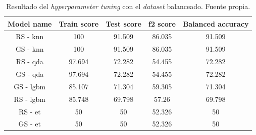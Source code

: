 \begin{table}[!ht]
    \centering
    \begin{tabular}{|c|cccc|} \hline
        Model name & Train score & Test score & f2 score & Balanced accuracy \\ \hline
        RS - knn & 100 & 91.509 & 86.035 & 91.509 \\
        GS - knn & 100 & 91.509 & 86.035 & 91.509 \\
        RS - qda & 97.694 & 72.282 & 54.455 & 72.282 \\
        GS - qda & 97.694 & 72.282 & 54.455 & 72.282 \\
        GS - lgbm & 85.107 & 71.304 & 59.305 & 71.304 \\
        RS - lgbm & 85.748 & 69.798 & 57.26 & 69.798 \\
        RS - et & 50 & 50 & 52.326 & 50 \\
        GS - et & 50 & 50 & 52.326 & 50 \\ \hline
    \end{tabular}
    \caption{Resultado del \textit{hyperparameter tuning} con el \textit{dataset} balanceado. Fuente propia.}\ \label{tab:hyperparameter-tuning-results-v2}
\end{table}